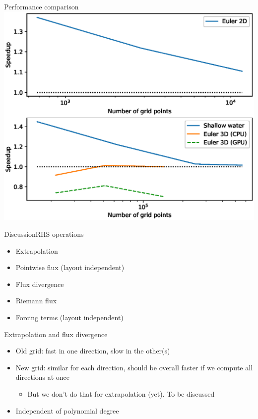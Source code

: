 \documentclass{beamer}
\begin{document}
\begin{frame}{Performance comparison}
    \includegraphics[scale=0.66]{img/layout_perf.eps}
\end{frame}

\begin{frame}{Discussion}{RHS operations}
\begin{itemize}
    \item Extrapolation
    \item Pointwise flux (layout independent)
    \item Flux divergence
    \item Riemann flux
    \item Forcing terms (layout independent)
\end{itemize}
\end{frame}

\begin{frame}{Extrapolation and flux divergence}
\begin{itemize}
    \item Old grid: fast in one direction, slow in the other(s)
    \item New grid: similar for each direction, should be overall faster if we compute all directions at once
        \begin{itemize} \item But we don't do that for extrapolation (yet). To be discussed \end{itemize}
    \item Independent of polynomial degree
\end{itemize}
\end{frame}
\end{document}
